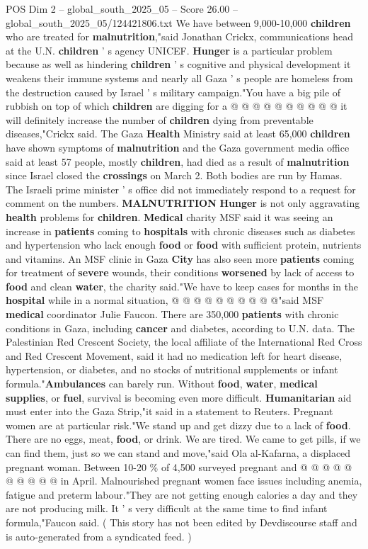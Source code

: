 \begin{textsample}{POS Dim 2 – global\_south\_2025\_05 – Score 26.00 – global\_south\_2025\_05/124421806.txt}
We have between 9,000-10,000 \textbf{children} who are treated for \textbf{malnutrition},"said Jonathan Crickx, communications head at the U.N. \textbf{children} ' s agency UNICEF. \textbf{Hunger} is a particular problem because as well as hindering \textbf{children} ' s cognitive and physical development it weakens their immune systems and nearly all Gaza ' s people are homeless from the destruction caused by Israel ' s military campaign."You have a big pile of rubbish on top of which \textbf{children} are digging for a @ @ @ @ @ @ @ @ @ @ it will definitely increase the number of \textbf{children} dying from preventable diseases,"Crickx said.
The Gaza \textbf{Health} Ministry said at least 65,000 \textbf{children} have shown symptoms of \textbf{malnutrition} and the Gaza government media office said at least 57 people, mostly \textbf{children}, had died as a result of \textbf{malnutrition} since Israel closed the \textbf{crossings} on March 2.
Both bodies are run by Hamas.
The Israeli prime minister ' s office did not immediately respond to a request for comment on the numbers. \textbf{MALNUTRITION} \textbf{Hunger} is not only aggravating \textbf{health} problems for \textbf{children}. \textbf{Medical} charity MSF said it was seeing an increase in \textbf{patients} coming to \textbf{hospitals} with chronic diseases such as diabetes and hypertension who lack enough \textbf{food} or \textbf{food} with sufficient protein, nutrients and vitamins.
An MSF clinic in Gaza \textbf{City} has also seen more \textbf{patients} coming for treatment of \textbf{severe} wounds, their conditions \textbf{worsened} by lack of access to \textbf{food} and clean \textbf{water}, the charity said."We have to keep cases for months in the \textbf{hospital} while in a normal situation, @ @ @ @ @ @ @ @ @ @"said MSF \textbf{medical} coordinator Julie Faucon.
There are 350,000 \textbf{patients} with chronic conditions in Gaza, including \textbf{cancer} and diabetes, according to U.N. data.
The Palestinian Red Crescent Society, the local affiliate of the International Red Cross and Red Crescent Movement, said it had no medication left for heart disease, hypertension, or diabetes, and no stocks of nutritional supplements or infant formula."\textbf{Ambulances} can barely run.
Without \textbf{food}, \textbf{water}, \textbf{medical} \textbf{supplies}, or \textbf{fuel}, survival is becoming even more difficult. \textbf{Humanitarian} aid must enter into the Gaza Strip,"it said in a statement to Reuters.
Pregnant women are at particular risk."We stand up and get dizzy due to a lack of \textbf{food}.
There are no eggs, meat, \textbf{food}, or drink.
We are tired.
We came to get pills, if we can find them, just so we can stand and move,"said Ola al-Kafarna, a displaced pregnant woman.
Between 10-20 \% of 4,500 surveyed pregnant and @ @ @ @ @ @ @ @ @ @ in April.
Malnourished pregnant women face issues including anemia, fatigue and preterm labour."They are not getting enough calories a day and they are not producing milk.
It ' s very difficult at the same time to find infant formula,"Faucon said. ( This story has not been edited by Devdiscourse staff and is auto-generated from a syndicated feed. )


\end{textsample}

